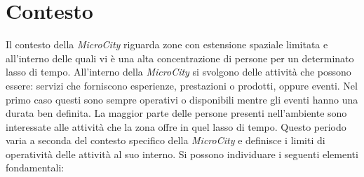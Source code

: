 \section{Contesto}
Il contesto della \textit{MicroCity} riguarda zone con estensione spaziale limitata e all'interno delle quali vi è una alta concentrazione di persone per un determinato lasso di tempo.
All'interno della \textit{MicroCity} si svolgono delle attività che possono essere: servizi che forniscono esperienze, prestazioni o prodotti, oppure eventi. Nel primo caso questi sono sempre operativi o disponibili mentre gli eventi hanno una durata ben definita.
La maggior parte delle persone presenti nell’ambiente sono interessate alle attività che la zona offre in quel lasso di tempo. Questo periodo varia a seconda del contesto specifico della \textit{MicroCity} e definisce i limiti di operatività delle attività al suo interno.
Si possono individuare i seguenti elementi fondamentali:
